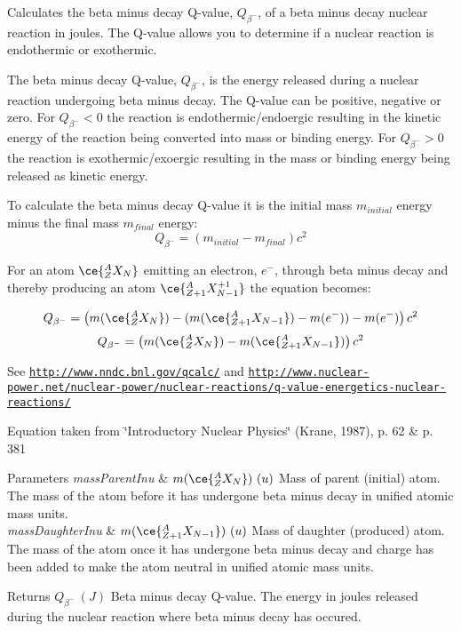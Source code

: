 Calculates the beta minus decay Q-\/value, $Q_{\beta^-}$, of a beta minus decay nuclear reaction in joules. The Q-\/value allows you to determine if a nuclear reaction is endothermic or exothermic. 

The beta minus decay Q-\/value, $Q_{\beta^-}$, is the energy released during a nuclear reaction undergoing beta minus decay. The Q-\/value can be positive, negative or zero. For $Q_{\beta^-} < 0$ the reaction is endothermic/endoergic resulting in the kinetic energy of the reaction being converted into mass or binding energy. For $Q_{\beta^-} > 0$ the reaction is exothermic/exoergic resulting in the mass or binding energy being released as kinetic energy.

To calculate the beta minus decay Q-\/value it is the initial mass $m_{initial}$ energy minus the final mass $m_{final}$ energy\+: \[Q_{\beta^-} = \left ( m_{initial}-m_{final}\right ) c^2\]

For an atom $\ce{ ^{A}_{Z}X_{N} }$ emitting an electron, $e^-$, through beta minus decay and thereby producing an atom $\ce{ ^{A}_{Z{+1}}X^{+1}_{N-1} }$ the equation becomes\+:

\[Q_{\beta^-} = \left ( m(\ce{ ^{A}_{Z}X_{N} }) - (m(\ce{ ^{A}_{Z{+1}}X_{N-1} }) - m(e^-)) - m(e^-)\right ) c^2\] \[Q_{\beta^-} = \left ( m(\ce{ ^{A}_{Z}X_{N} }) - m(\ce{ ^{A}_{Z{+1}}X_{N-1} })\right ) c^2\]

See \href{http://www.nndc.bnl.gov/qcalc/}{\tt http\+://www.\+nndc.\+bnl.\+gov/qcalc/} and \href{http://www.nuclear-power.net/nuclear-power/nuclear-reactions/q-value-energetics-nuclear-reactions/}{\tt http\+://www.\+nuclear-\/power.\+net/nuclear-\/power/nuclear-\/reactions/q-\/value-\/energetics-\/nuclear-\/reactions/}

Equation taken from \char`\"{}\+Introductory Nuclear Physics\char`\"{} (Krane, 1987), p. 62 \& p. 381


\begin{DoxyParams}{Parameters}
{\em mass\+Parent\+Inu} & $m(\ce{ ^{A}_{Z}X_{N} })\ (u)$ Mass of parent (initial) atom. The mass of the atom before it has undergone beta minus decay in unified atomic mass units. \\
\hline
{\em mass\+Daughter\+Inu} & $m(\ce{ ^{A}_{Z{+1}}X_{N-1} })\ (u)$ Mass of daughter (produced) atom. The mass of the atom once it has undergone beta minus decay and charge has been added to make the atom neutral in unified atomic mass units. \\
\hline
\end{DoxyParams}
\begin{DoxyReturn}{Returns}
$Q_{\beta^-}\ (J)$ Beta minus decay Q-\/value. The energy in joules released during the nuclear reaction where beta minus decay has occured. 
\end{DoxyReturn}
\mbox{\label{group___q_value_ga42468e998cf58a027a676755aa1339ba}} 
